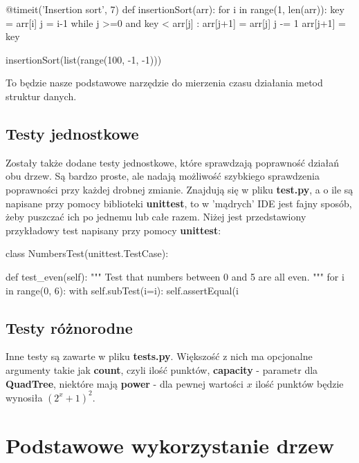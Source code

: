 \documentclass[a4paper, 12pt]{article}
\begin{document}
      \begin{python}
      @timeit('Insertion sort', 7)
      def insertionSort(arr): 
          for i in range(1, len(arr)): 
              key = arr[i] 
              j = i-1
              while j >=0 and key < arr[j] : 
                      arr[j+1] = arr[j] 
                      j -= 1
              arr[j+1] = key 
              
      insertionSort(list(range(100, -1, -1)))
      \end{python}

      \noindent
      \quad To będzie nasze podstawowe narzędzie do mierzenia czasu działania metod struktur danych. 

    \subsection{Testy jednostkowe}
      \quad Zostały także dodane testy jednostkowe, które sprawdzają poprawność działań obu drzew. Są bardzo proste, ale nadają możliwość szybkiego sprawdzenia poprawności przy każdej drobnej zmianie. Znajdują się w pliku \textbf{test.py}, a o ile są napisane przy pomocy biblioteki \textbf{unittest}, to w 'mądrych' IDE jest fajny sposób, żeby puszczać ich po jednemu lub całe razem. Niżej jest przedstawiony przykładowy test napisany przy pomocy \textbf{unittest}:

      \begin{python}
      class NumbersTest(unittest.TestCase):

          def test_even(self):
              """
              Test that numbers between 0 and 5 are all even.
              """
              for i in range(0, 6):
                  with self.subTest(i=i):
                      self.assertEqual(i %
      \end{python}

    \subsection{Testy różnorodne}
      \quad Inne testy są zawarte w pliku \textbf{tests.py}. Większość z nich ma opcjonalne argumenty takie jak \textbf{count}, czyli ilość punktów, \textbf{capacity} - parametr dla \textbf{QuadTree}, niektóre mają \textbf{power} - dla pewnej wartości $x$ ilość punktów będzie wynosiła $(2^{x} + 1)^2$.

  \section{Podstawowe wykorzystanie drzew}
\end{document}
